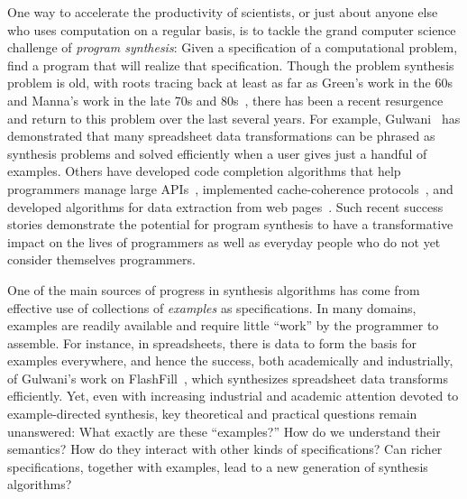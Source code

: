 
One way to accelerate the productivity of scientists, or just about
anyone else who uses computation on a regular basis, is to tackle the
grand computer science challenge of \emph{program synthesis}: Given a
specification of a computational problem, find a program that will
realize that specification.  
Though the problem synthesis problem is
old, with roots tracing back at least as far as Green's work in the
60s~\cite{green-ijcai-1969} and Manna's work in the late 70s and
80s~\cite{manna-tse-1979,manna-plas-1980}, there has been a recent
resurgence and return to this problem over the last several years.
For example, Gulwani~\cite{gulwani-popl-2011} has demonstrated that
many spreadsheet data transformations can be phrased as synthesis
problems and solved efficiently when a user gives just a handful of
examples.  Others have developed code completion algorithms that help
programmers manage large APIs~\cite{perelman-pldi-2012,gvero-pldi-2013}, 
implemented cache-coherence protocols~\cite{udupa-pldi-2013}, and developed
algorithms for data extraction from web pages~\cite{vu-pldi-2014}.
Such recent success stories demonstrate the potential for program
synthesis to have a transformative impact on the lives of programmers
as well as everyday people who do not yet consider themselves
programmers.



One of the main sources of progress in synthesis algorithms
has come from effective use of collections of
\emph{examples} as specifications.  In many domains, examples are
readily available and require little ``work'' by the programmer to
assemble.  For instance, in spreadsheets, there is data to form the
basis for examples everywhere, and hence the success, both
academically and industrially, of Gulwani's work on
FlashFill~\cite{gulwani-popl-2011}, which synthesizes spreadsheet data
transforms efficiently.
Yet, even with increasing industrial and academic attention devoted
to example-directed synthesis, key theoretical and practical questions remain
unanswered:  What exactly are these ``examples?'' 
How do we understand their semantics?  How do they interact with other
kinds of specifications?  Can richer specifications, together with
examples, lead to a new generation of synthesis algorithms?

